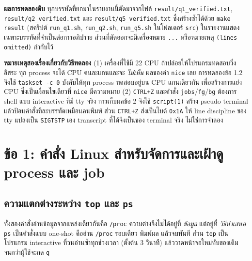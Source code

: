 \documentclass[a4paper,11pt]{article}
\newcommand{\code}[1]{\texttt{#1}}
\begin{document}
\textbf{ผลการทดลองดิบ} \quad ทุกบรรทัดที่ยกมาในรายงานนี้ตัดมาจากไฟล์
\code{result/q1\_verified.txt}, \code{result/q2\_verified.txt} และ
\code{result/q5\_verified.txt} ซึ่งสร้างซ้ำได้ด้วย \code{make result}
(สคริปต์ \code{run\_q1.sh}, \code{run\_q2.sh}, \code{run\_q5.sh} ในโฟลเดอร์ \code{src})
ในรายงานแสดงเฉพาะบรรทัดที่จำเป็นต่อการอภิปราย ส่วนที่ตัดออกจะมีเครื่องหมาย
\code{...} หรือหมายเหตุ \code{(lines omitted)} กำกับไว้

\textbf{หมายเหตุสองเรื่องเกี่ยวกับวิธีทดลอง} \quad
(1) เครื่องที่ใช้มี 22 CPU ถ้าปล่อยให้โปรแกรมทดสอบวิ่งอิสระ ทุก process
จะได้ CPU คนละแกนและจะ \emph{ไม่เห็น} ผลของค่า \code{nice} เลย
การทดลองข้อ 1.2 จึงใช้ \code{taskset -c 0} บังคับให้ทุก process ทดสอบอยู่บน
CPU แกนเดียวกัน เพื่อสร้างการแย่ง CPU ซึ่งเป็นเงื่อนไขเดียวที่ \code{nice} มีความหมาย
(2) \code{CTRL+Z} และคำสั่ง \code{jobs}/\code{fg}/\code{bg} ต้องการ shell แบบ
interactive ที่มี tty จริง การเก็บผลข้อ 2 จึงใช้ \code{script(1)} สร้าง
pseudo terminal แล้วป้อนคำสั่งทีละบรรทัดเหมือนคนพิมพ์ ส่วน \code{CTRL+Z}
ส่งเป็นไบต์ \code{0x1A} ให้ line discipline ของ tty แปลงเป็น \code{SIGTSTP} เอง
transcript ที่ได้จึงเป็นของ terminal จริง ไม่ใช่การจำลอง

\section{ข้อ 1: คำสั่ง Linux สำหรับจัดการและเฝ้าดู process และ job}

\subsection{ความแตกต่างระหว่าง \code{top} และ \code{ps}}

ทั้งสองคำสั่งอ่านข้อมูลจากแหล่งเดียวกันคือ \code{/proc} ความต่างจึงไม่ได้อยู่ที่
\emph{ข้อมูล} แต่อยู่ที่ \emph{วิธีนำเสนอ} \code{ps} เป็นคำสั่งแบบ one-shot
คืออ่าน \code{/proc} รอบเดียว พิมพ์ผล แล้วจบทันที ส่วน \code{top} เป็นโปรแกรม
interactive ที่วนอ่านซ้ำทุกช่วงเวลา (ตั้งต้น 3 วินาที) แล้ววาดหน้าจอใหม่ทับของเดิม
จนกว่าผู้ใช้จะกด \code{q}
\end{document}
